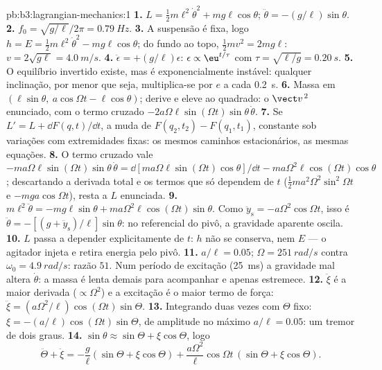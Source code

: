 \begin{solution}{pb:b3:lagrangian-mechanics:1}
\textbf{1.} $L = \tfrac12 m\ell^2\dot\theta^2 + mg\ell\cos\theta$;
$\ddot\theta = -(g/\ell)\sin\theta$.
\textbf{2.} $f_0 = \sqrt{g/\ell}/2\pi = \qty{0.79}{Hz}$.
\textbf{3.} A suspensão é fixa, logo $h = E = \tfrac12
m\ell^2\dot\theta^2 - mg\ell\cos\theta$; do fundo ao topo, $\tfrac12
mv^2 = 2mg\ell$: $v = 2\sqrt{g\ell} = \qty{4.0}{m/s}$.
\textbf{4.} $\ddot\epsilon = +(g/\ell)\epsilon$: $\epsilon \propto
\eu^{t/\tau}$ com $\tau = \sqrt{\ell/g} = \qty{0.20}{s}$.
\textbf{5.} O equilíbrio invertido existe, mas é exponencialmente
instável: qualquer inclinação, por menor que seja, multiplica-se por
$e$ a cada \qty{0.2}{s}.
\textbf{6.} Massa em $(\ell\sin\theta,\ a\cos\Omega t - \ell\cos\theta)$;
derive e eleve ao quadrado: o $\vect v^{\,2}$ enunciado, com o termo
cruzado $-2a\Omega\ell\sin(\Omega t)\sin\theta\,\dot\theta$.
\textbf{7.} Se $L' = L + \dd F(q,t)/\dd t$, a  muda de
$F(q_2, t_2) - F(q_1, t_1)$, constante sob variações com extremidades
fixas: os mesmos caminhos estacionários, as mesmas equações.
\textbf{8.} O termo cruzado vale $-ma\Omega\ell\sin(\Omega t)\sin\theta\,
\dot\theta = \dd[ma\Omega\ell\sin(\Omega t)\cos\theta]/\dd t -
ma\Omega^2\ell\cos(\Omega t)\cos\theta$; descartando a derivada total
e os termos que só dependem de $t$ ($\tfrac12 ma^2\Omega^2\sin^2\Omega t$ e
$-mga\cos\Omega t$), resta a $L$ enunciada.
\textbf{9.} $m\ell^2\ddot\theta = -mg\ell\sin\theta +
ma\Omega^2\ell\cos(\Omega t)\sin\theta$. Como $\ddot y_{\text{s}} =
-a\Omega^2\cos\Omega t$, isso é $\ddot\theta =
-[(g + \ddot y_{\text{s}})/\ell]\sin\theta$: no referencial do pivô, a
gravidade aparente oscila.
\textbf{10.} $L$ passa a depender explicitamente de $t$: $h$ não se
conserva, nem $E$ --- o agitador injeta e retira energia pelo pivô.
\textbf{11.} $a/\ell = 0.05$; $\Omega = \qty{251}{rad/s}$ contra
$\omega_0 = \qty{4.9}{rad/s}$: razão $51$. Num período de excitação
(\qty{25}{ms}) a gravidade mal altera $\dot\theta$: a massa é lenta
demais para acompanhar e apenas estremece.
\textbf{12.} $\ddot\xi$ é a maior derivada ($\propto\Omega^2$) e a
excitação é o maior termo de força: $\ddot\xi =
(a\Omega^2/\ell)\cos(\Omega t)\sin\Theta$.
\textbf{13.} Integrando duas vezes com $\Theta$ fixo: $\xi =
-(a/\ell)\cos(\Omega t)\sin\Theta$, de amplitude no máximo $a/\ell =
0.05$: um tremor de dois graus.
\textbf{14.} $\sin\theta \approx \sin\Theta + \xi\cos\Theta$, logo
\[
\ddot\Theta + \ddot\xi = -\frac{g}{\ell}(\sin\Theta + \xi\cos\Theta)
 + \frac{a\Omega^2}{\ell}\cos\Omega t\,(\sin\Theta + \xi\cos\Theta) .
\]
\end{solution}
